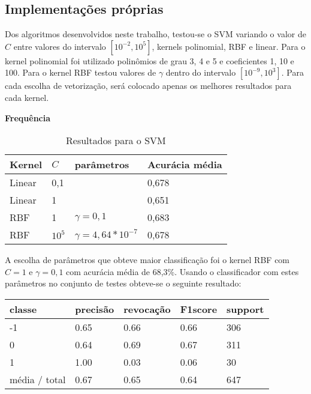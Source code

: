 \subsection{Implementações próprias}

Dos algoritmos desenvolvidos neste trabalho, testou-se o SVM variando o valor de $C$ entre valores
do intervalo $[10^{-2}, 10^5]$, kernels polinomial, RBF e linear. Para o kernel polinomial foi utilizado
polinômios de grau 3, 4 e 5 e coeficientes 1, 10 e 100. Para o kernel RBF testou valores de $\gamma$
dentro do intervalo $[10^{-9}, 10^3]$. Para cada escolha de vetorização, será colocado apenas os
melhores resultados para cada kernel.

\textbf{Frequência}

\begin{table}[H]
	\centering
	\caption{Resultados para o SVM}
	\begin{tabular}{l l l l}
		\hline
		Kernel & $C$ & parâmetros & Acurácia média \\
		\hline
		Linear & 0,1 & & 0,678 \\
		\hline
		Linear & 1 & & 0,651 \\
		\hline
		RBF & 1 & $\gamma = 0,1$ & 0,683 \\
		\hline
		RBF & $10^5$ & $\gamma = 4,64*10^{-7}$ & 0,678 \\
		\hline
	\end{tabular}
\end{table}

A escolha de parâmetros que obteve maior classificação foi o kernel RBF com $C = 1$ e $\gamma = 0,1$
com acurácia média de 68,3\%. Usando o classificador com estes parâmetros no conjunto de testes
obteve-se o seguinte resultado:

\begin{table}[H]
	\centering
	\begin{tabular}{l | l | l | l | l}
		\hline
		classe  	&	precisão  &  revocação &  F1\-score &  support \\
		\hline
         -1   &    0.65  &    0.66   &   0.66   &    306 \\
         \hline
          0   &    0.64   &   0.69   &   0.67    &   311 \\
          \hline
          1   &    1.00   &   0.03   &   0.06    &    30 \\
		\hline
		média / total   &    0.67   &   0.65   &   0.64   &    647 \\
		\hline
	\end{tabular}
\end{table}

